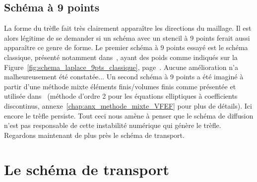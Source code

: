 \documentclass[main.tex]{subfiles}
\begin{document}
\subsection{Schéma à 9 points}
La forme du trèfle fait très clairement apparaître les directions du maillage. Il est alors légitime de se demander si un schéma avec un stencil à 9 points ferait aussi apparaître ce genre de forme. 
Le premier schéma à 9 points essayé est le schéma classique, présenté notamment dans~\cite{leveque2007finite}, ayant des poids comme indiqués sur la Figure~\ref{fig:schema_laplace_9pts_classique}, page~\pageref{fig:schema_laplace_9pts_classique}. Aucune amélioration n'a malheureusement été constatée... Un second schéma à 9 points a été imaginé à partir d'une méthode mixte éléments finis/volumes finis comme présentée et utilisée dans~\cite{latige2013second} (méthode d'ordre 2 pour les équations elliptiques à coefficients discontinus, \cf annexe~\ref{chap:anx_methode_mixte_VFEF} pour plus de détails). 
Ici encore le trèfle persiste. Tout ceci nous amène à penser que le schéma de diffusion n'est pas responsable de cette instabilité numérique qui génère le trèfle. Regardons maintenant de plus près le schéma de transport. 

\section{Le schéma de transport}
\end{document}
